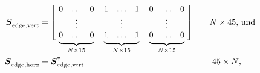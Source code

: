 \begin{align*}
    \boldsymbol{S}_{\mathrm{edge},\mathrm{vert}}^{\phantom{\intercal}} & = \left[\phantom{
            \begin{matrix}
                0      \\
                \vdots \\
                0      \\
            \end{matrix}}
        \right.\hspace{-0.5em}
        \underbrace{\begin{matrix}
                0 & \hdots & 0 \\
                  & \vdots &   \\
                0 & \hdots & 0 \\
            \end{matrix}}_{N \times 15}
        \quad\underbrace{\begin{matrix}
                1 & \hdots & 1 \\
                  & \vdots &   \\
                1 & \hdots & 1 \\
            \end{matrix}}_{N \times 15}
        \quad\underbrace{\begin{matrix}
                0 & \hdots & 0 \\
                  & \vdots &   \\
                0 & \hdots & 0 \\
            \end{matrix}}_{N \times 15}
        \hspace{-0.5em}
        \left.\phantom{
            \begin{matrix}
                0      \\
                \vdots \\
                0      \\
            \end{matrix}
    }\right] \quad                                                     & N \times 45 {,}\                                                 & \text{und}        \\
    \boldsymbol{S}_{\mathrm{edge},\mathrm{horz}}^{\phantom{\intercal}} & = \boldsymbol{S}_{\mathrm{edge},\mathrm{vert}}^{\intercal} \quad & 45 \times N {,} &
\end{align*}
%
